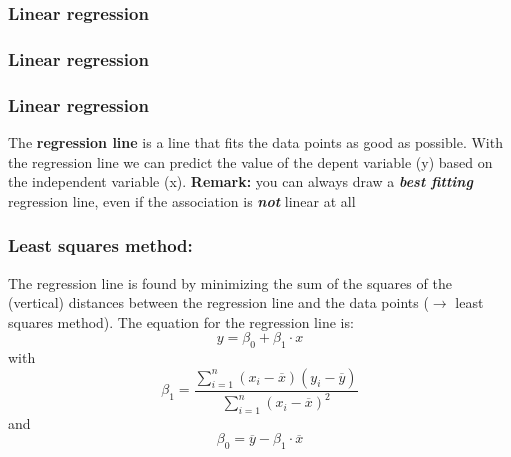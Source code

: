 \documentclass{beamer}
\begin{document}
\begin{frame}
  \frametitle{Linear regression}
  \centering
\end{frame}

\begin{frame}
  \frametitle{Linear regression}
  \centering
\end{frame}

\begin{frame}
\frametitle{Linear regression}
\vfill
The \textbf{regression line} is a line that fits the data points as good as possible.
\vfill
With the regression line we can predict the value of the depent variable (y) based on the independent variable (x).
\vfill
\textbf{Remark:} you can always draw a \textbf{\textit{best fitting}} regression line, even if the association is \textit{\textbf{not}} linear at all
\end{frame}


\begin{frame}
\frametitle{Least squares method:}
The regression line is found by minimizing the sum of the squares of the (vertical) distances
between the regression line and the data points ($\rightarrow$ least squares method).
\vfill
The equation for the regression line is:
\[ y = \beta_0 + \beta_1 \cdot x \]
with
\[ \beta_1 = \frac{\sum_{i=1}^{n}(x_i - \overline{x})(y_i - \overline{y})}{\sum_{i=1}^{n}(x_i - \overline{x})^2} \]
and
\[ \beta_0 = \overline{y} - \beta_1 \cdot \overline{x} \]
\end{frame}
\end{document}

